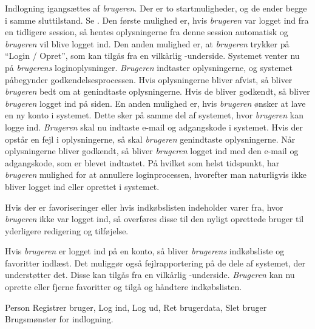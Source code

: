 {Indlogning igangsættes af \textit{brugeren}. Der er to startmuligheder, og de ender begge i samme sluttilstand. Se . Den første mulighed er, hvis \textit{brugeren} var logget ind fra en tidligere session, så hentes oplysningerne fra denne session automatisk og \textit{brugeren} vil blive logget ind. Den anden mulighed er, at \textit{brugeren} trykker på “Login / Opret”, som kan tilgås fra en vilkårlig \Foodl-underside. Systemet venter nu på \textit{brugerens} loginoplysninger. \textit{Brugeren} indtaster oplysningerne, og systemet påbegynder godkendelsesprocessen. Hvis oplysningerne bliver afvist, så bliver \textit{brugeren} bedt om at genindtaste oplysningerne. Hvis de bliver godkendt, så bliver \textit{brugeren} logget ind på siden. En anden mulighed er, hvis \textit{brugeren} ønsker at lave en ny konto i systemet. Dette sker på samme del af systemet, hvor \textit{brugeren} kan logge ind. \textit{Brugeren} skal nu indtaste e-mail og adgangskode i systemet. Hvis der opstår en fejl i oplysningerne, så skal \textit{brugeren} genindtaste oplysningerne. Når oplysningerne bliver godkendt, så bliver \textit{brugeren} logget ind med den e-mail og adgangskode, som er blevet indtastet. På hvilket som helst tidspunkt, har \textit{brugeren} mulighed for at annullere loginprocessen, hvorefter man naturligvis ikke bliver logget ind eller oprettet i systemet.

Hvis der er favoriseringer eller hvis indkøbslisten indeholder varer fra, hvor \textit{brugeren} ikke var logget ind, så overføres disse til den nyligt oprettede bruger til yderligere redigering og tilføjelse.

Hvis \textit{brugeren} er logget ind på en konto, så bliver \textit{brugerens} indkøbsliste og favoritter indlæst. Det muliggør også fejlrapportering på de dele af systemet, der understøtter det. Disse kan tilgås fra en vilkårlig \Foodl-underside. \textit{Brugeren} kan nu oprette eller fjerne favoritter og tilgå og håndtere indkøbslisten.}
{Person}
{Registrer bruger, Log ind, Log ud, Ret brugerdata, Slet bruger}
{Brugsmønster for indlogning.}
